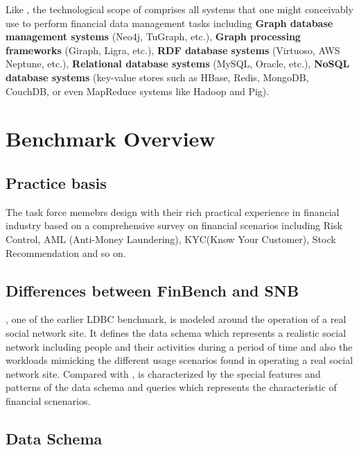 Like \ldbcsnb, the technological scope of \ldbcfinbench comprises all systems that
one might conceivably use to perform financial data management tasks including
\textbf{Graph database management systems} (\eg Neo4j, TuGraph, etc.), \textbf{
Graph processing frameworks} (\eg Giraph, Ligra, etc.), \textbf{RDF database
systems} (\eg Virtuoso, AWS Neptune, etc.), \textbf{Relational database systems}
(\eg MySQL, Oracle, etc.), \textbf{NoSQL database systems} (\eg key-value stores
such as HBase, Redis, MongoDB, CouchDB, or even MapReduce systems like Hadoop
and Pig).


\section{Benchmark Overview}

\subsection{Practice basis}

The task force memebrs design \ldbcfinbench with their rich practical experience in
financial industry based on a comprehensive survey on financial scenarios including
Risk Control, AML (Anti-Money Laundering), KYC(Know Your Customer), Stock Recommendation
and so on.

\subsection{Differences between FinBench and SNB}

\ldbcsnb, one of the earlier LDBC benchmark, is modeled around the operation of a real social network site. It defines the data schema which represents a realistic social network including people and their activities during a period of time and also the workloads mimicking the different usage scenarios found in operating a real social network site. Compared with \ldbcsnb, \ldbcfinbench is characterized by the special features and patterns of the data schema and queries which represents the characteristic of financial scnenarios.

\subsection{Data Schema}

